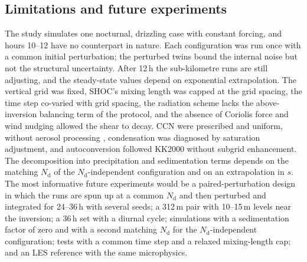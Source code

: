 \documentclass[acp, manuscript]{copernicus}
\newcommand{\Nd}{N_\mathrm{d}}
\begin{document}
\subsection{Limitations and future experiments}\label{sec:limits}

The study simulates one nocturnal, drizzling case with constant forcing, and hours 10--12 have no counterpart in nature. Each configuration was run once with a common initial perturbation; the perturbed twins bound the internal noise but not the structural uncertainty. After 12\,h the sub-kilometre runs are still adjusting, and the steady-state values depend on exponential extrapolation. The vertical grid was fixed, SHOC's mixing length was capped at the grid spacing, the time step co-varied with grid spacing, the radiation scheme lacks the above-inversion balancing term of the protocol, and the absence of Coriolis force and wind nudging allowed the shear to decay. CCN were prescribed and uniform, without aerosol processing \citep{kazil2011,berner2013,goren2019,yamaguchi2017}, condensation was diagnosed by saturation adjustment, and autoconversion followed KK2000 without subgrid enhancement. The decomposition into precipitation and sedimentation terms depends on the matching $\Nd$ of the $\Nd$-independent configuration and on an extrapolation in $s$. The most informative future experiments would be a paired-perturbation design in which the runs are spun up at a common $\Nd$ and then perturbed and integrated for 24--36\,h with several seeds; a 312\,m pair with 10--15\,m levels near the inversion; a 36\,h set with a diurnal cycle; simulations with a sedimentation factor of zero and with a second matching $\Nd$ for the $\Nd$-independent configuration; tests with a common time step and a relaxed mixing-length cap; and an LES reference with the same microphysics.

\conclusions\label{sec:conclusions}
\end{document}
